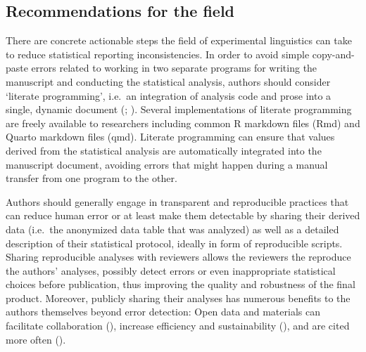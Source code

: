 \documentclass[
  doc,
  longtable,
  nolmodern,
  notxfonts,
  notimes,
  colorlinks=true,linkcolor=blue,citecolor=blue,urlcolor=blue]{apa7}
\begin{document}
\subsection{Recommendations for the
field}\label{recommendations-for-the-field}

There are concrete actionable steps the field of experimental
linguistics can take to reduce statistical reporting inconsistencies. In
order to avoid simple copy-and-paste errors related to working in two
separate programs for writing the manuscript and conducting the
statistical analysis, authors should consider `literate programming',
i.e.~an integration of analysis code and prose into a single, dynamic
document (;
). Several implementations
of literate programming are freely available to researchers including
common R markdown files (Rmd) and Quarto markdown files (qmd). Literate
programming can ensure that values derived from the statistical analysis
are automatically integrated into the manuscript document, avoiding
errors that might happen during a manual transfer from one program to
the other.

Authors should generally engage in transparent and reproducible
practices that can reduce human error or at least make them detectable
by sharing their derived data (i.e.~the anonymized data table that was
analyzed) as well as a detailed description of their statistical
protocol, ideally in form of reproducible scripts. Sharing reproducible
analyses with reviewers allows the reviewers the reproduce the authors'
analyses, possibly detect errors or even inappropriate statistical
choices before publication, thus improving the quality and robustness of
the final product. Moreover, publicly sharing their analyses has
numerous benefits to the authors themselves beyond error detection: Open
data and materials can facilitate collaboration
(), increase efficiency
and sustainability (), and are cited more often
().
\end{document}

